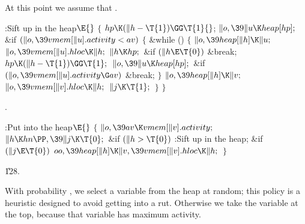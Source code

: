 At this point we assume that .

\Y\B\4:Sift  up in the heap\X${}\E{}$\6
${}\{{}$\1\6
${}\\{hp}\K(\|h-\T{1})\GG\T{1}{}$;\6
${}\|o,\39\|u\K\\{heap}[\\{hp}];{}$\6
\&{if} ${}(\|o,\39\\{vmem}[\|u].\\{activity}<\\{av}){}$\5
${}\{{}$\1\6
\&{while} ()\5
${}\{{}$\1\6
${}\|o,\39\\{heap}[\|h]\K\|u;{}$\6
${}\|o,\39\\{vmem}[\|u].\\{hloc}\K\|h;{}$\6
${}\|h\K\\{hp};{}$\6
\&{if} ${}(\|h\E\T{0}){}$\1\5
\&{break};\2\6
${}\\{hp}\K(\|h-\T{1})\GG\T{1};{}$\6
${}\|o,\39\|u\K\\{heap}[\\{hp}];{}$\6
\&{if} ${}(\|o,\39\\{vmem}[\|u].\\{activity}\G\\{av}){}$\1\5
\&{break};\2\6
\4${}\}{}$\2\6
${}\|o,\39\\{heap}[\|h]\K\|v;{}$\6
${}\|o,\39\\{vmem}[\|v].\\{hloc}\K\|h;{}$\6
${}\|j\K\T{1};{}$\6
\4${}\}{}$\2\6
\4${}\}{}$\2\par
{}.\fi

\B{}:Put  into the heap\X${}\E{}$\6
${}\{{}$\1\6
${}\|o,\39\\{av}\K\\{vmem}[\|v].\\{activity};{}$\6
${}\|h\K\\{hn}\PP,\39\|j\K\T{0};{}$\6
\&{if} ${}(\|h>\T{0}){}$\1\5
:Sift  up in the heap\X;\2\6
\&{if} ${}(\|j\E\T{0}){}$\1\5
${}\\{oo},\39\\{heap}[\|h]\K\|v,\39\\{vmem}[\|v].\\{hloc}\K\|h;{}$\2\6
\4${}\}{}$\2\par
\U128.\fi

With probability , we select a variable from the heap
at random;
this policy is a heuristic designed to avoid getting into a rut.
Otherwise we take the variable at the top, because that variable has
maximum activity.

